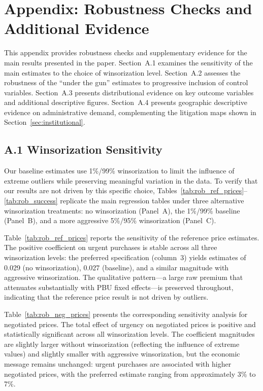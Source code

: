 \clearpage
\appendix
\renewcommand{\thesection}{A}
\renewcommand{\thetable}{A.\arabic{table}}
\setcounter{table}{0}

\section*{Appendix: Robustness Checks and Additional Evidence}
\label{sec:appendix}

This appendix provides robustness checks and supplementary evidence for the main results presented in the paper. Section~A.1 examines the sensitivity of the main estimates to the choice of winsorization level. Section~A.2 assesses the robustness of the ``under the gun'' estimates to progressive inclusion of control variables. Section~A.3 presents distributional evidence on key outcome variables and additional descriptive figures. Section~A.4 presents geographic descriptive evidence on administrative demand, complementing the litigation maps shown in Section~\ref{sec:institutional}.

\subsection*{A.1 Winsorization Sensitivity}

Our baseline estimates use 1\%/99\% winsorization to limit the influence of extreme outliers while preserving meaningful variation in the data. To verify that our results are not driven by this specific choice, Tables~\ref{tab:rob_ref_prices}--\ref{tab:rob_success} replicate the main regression tables under three alternative winsorization treatments: no winsorization (Panel~A), the 1\%/99\% baseline (Panel~B), and a more aggressive 5\%/95\% winsorization (Panel~C).

Table~\ref{tab:rob_ref_prices} reports the sensitivity of the reference price estimates. The positive coefficient on urgent purchases is stable across all three winsorization levels: the preferred specification (column~3) yields estimates of 0.029 (no winsorization), 0.027 (baseline), and a similar magnitude with aggressive winsorization. The qualitative pattern---a large raw premium that attenuates substantially with PBU fixed effects---is preserved throughout, indicating that the reference price result is not driven by outliers.



Table~\ref{tab:rob_neg_prices} presents the corresponding sensitivity analysis for negotiated prices. The total effect of urgency on negotiated prices is positive and statistically significant across all winsorization levels. The coefficient magnitudes are slightly larger without winsorization (reflecting the influence of extreme values) and slightly smaller with aggressive winsorization, but the economic message remains unchanged: urgent purchases are associated with higher negotiated prices, with the preferred estimate ranging from approximately 3\% to 7\%.

